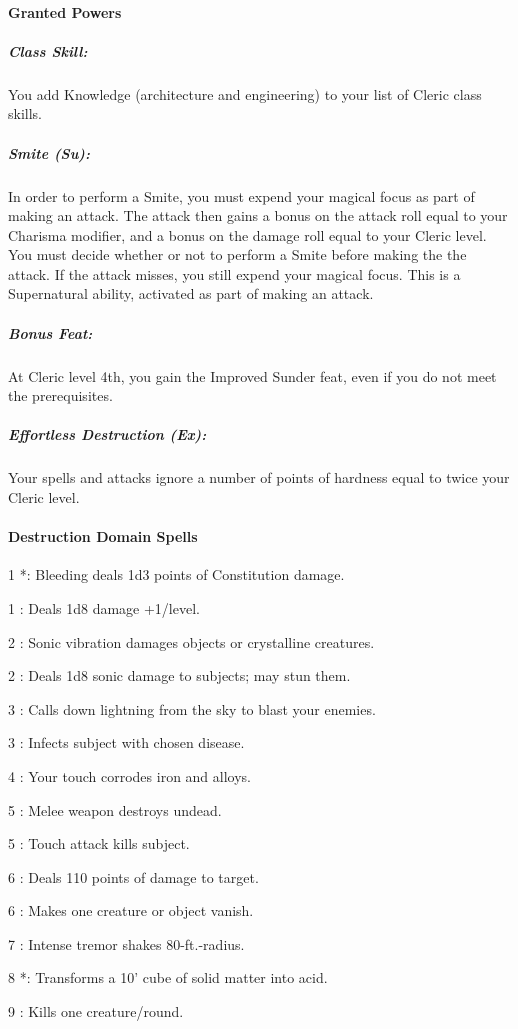 \paragraph{Granted Powers}
\subparagraph{Class Skill:} 
You add Knowledge (architecture and engineering) to your list of Cleric class skills.
\subparagraph{Smite (Su):}
In order to perform a Smite, you must expend your magical focus as part of making an attack.
The attack then gains a bonus on the attack roll equal to your Charisma modifier, and a bonus on the damage roll equal to your Cleric level.
You must decide whether or not to perform a Smite before making the the attack. 
If the attack misses, you still expend your magical focus.
This is a Supernatural ability, activated as part of making an attack.
\subparagraph{Bonus Feat:}
At Cleric level 4th, you gain the Improved Sunder feat, even if you do not meet the prerequisites.
\subparagraph{Effortless Destruction (Ex):}
Your spells and attacks ignore a number of points of hardness equal to twice your Cleric level.
\paragraph{Destruction Domain Spells}
\begin{list}{}{\leftmargin=1em}
\item[1] *: Bleeding deals 1d3 points of Constitution damage.
\item[1] : Deals 1d8 damage +1/level.
\item[2] : Sonic vibration damages objects or crystalline creatures.
\item[2] : Deals 1d8 sonic damage to subjects; may stun them.
\item[3] : Calls down lightning from the sky to blast your enemies.
\item[3] : Infects subject with chosen disease.
\item[4] : Your touch corrodes iron and alloys.
\item[5] : Melee weapon destroys undead.
\item[5] : Touch attack kills subject.
\item[6] : Deals 110 points of damage to target.
\item[6] : Makes one creature or object vanish.
\item[7] : Intense tremor shakes 80-ft.-radius.
\item[8] *: Transforms a 10' cube of solid matter into acid.
\item[9] : Kills one creature/round.
\end{list}

